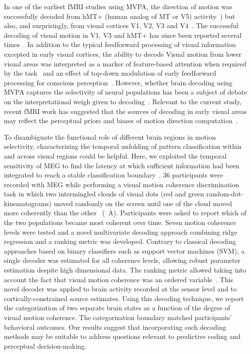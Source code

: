 In one of the earliest fMRI studies using MVPA, the direction of motion was successfully decoded from hMT+ (human analog of MT or V5) activity~\cite{12beauchamp1997graded}) but also, and surprisingly, from visual cortices V1, V2, V3 and V4~\cite{13kamitani2006decoding}. The successful decoding of visual motion in V1, V3 and hMT+ has since been reported several times~\cite{5kamitani2005decoding,13kamitani2006decoding,14serences2007representation,15hogendoorn2013decoding,16van2014decoding}. In addition to the typical feedforward processing of visual information excepted in early visual cortices, the ability to decode Visual motion from lower visual areas was interpreted as a marker of  feature-based attention when required by the task~\cite{13kamitani2006decoding} and an effect of top-down modulation of early feedforward processing for conscious perception~\cite{14serences2007representation}. However, whether brain decoding using MVPA captures the selectivity of neural populations has been a subject of debate on the interpretational weigh given to decoding~\cite{11haynes2015primer,17carlson2015sensible,mostert2015dissociating,pitts2012visual}. Relevant to the current study, recent fMRI work has suggested that the sources of decoding in early visual areas may reflect the perceptual priors and biases of motion direction computation~\cite{18vintch2014cortical}.

To disambiguate the functional role of different brain regions in motion selectivity, characterizing the temporal unfolding of pattern classification within and across visual regions could be helpful. Here, we exploited the temporal sensitivity of MEG to find the latency at which sufficient information had been integrated to reach a stable classification boundary~\cite{20mitchell2008predicting,21ramkumar2013feature,22king2014characterizing}. 36 participants were recorded with MEG while performing a visual motion coherence discrimination task in which two intermingled clouds of visual dots (red and green random-dot-kinematograms) moved randomly on the screen until one of the cloud moved more coherently than the other~\cite{23zilber2014supramodal} (~A). Participants were asked to report which of the two populations became most coherent over time. Seven motion coherence levels were tested and a novel multivariate decoding approach combining ridge regression and a ranking metric was developed. Contrary to classical decoding approaches based on binary classifiers such as support vector machines (SVM), a single decoder was estimated for all coherence levels, allowing robust parameter estimation despite high dimensional data. The ranking metric allowed taking into account the fact that visual motion coherence was an ordered variable~\cite{herbrich00ordinal,Joachims:2002}. This novel decoder was applied to brain activity recorded at the sensor level and to cortically-constrained source estimates. Using this decoding technique, we report the categorization of two separate brain states as a function of the degree of visual motion coherence. The categorization boundary matched participants' behavioral outcomes. Our results suggest that incorporating such decoding methods may be suitable to address questions relevant to predictive coding and perceptual decision-making.

